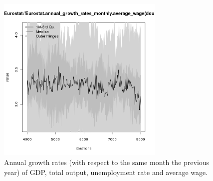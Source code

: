 \begin{figure}[H!]
\begin{minipage}{17cm}
\includegraphics[width=8cm]{./png/tax_0.05/Eurostat-annual_growth_rates_monthly-average_wage.png}
\end{minipage}
\caption{Annual growth rates (with respect to the same month the previous year) of GDP, total output, unemployment rate and average wage.}
\label{Figure: Eurostat macrodata growth rates}
\end{figure}
\clearpage

